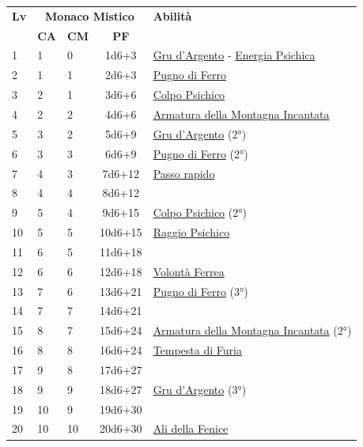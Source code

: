 {\begin{multicols}{2}


\noindent\begin{tabularx}{\linewidth}{p{0.3cm}|p{0.3cm}p{0.3cm}c|X|}
	\toprule
 \rowcolor{gray!20}	\textbf{Lv} & \multicolumn{3}{c|}{\textbf{Monaco Mistico}} & \textbf{Abilità} \\
& \centering\arraybackslash \textbf{CA} & \centering\arraybackslash \textbf{CM} & \centering\arraybackslash \textbf{PF} & \\
	\toprule
	1 &1	& 0	&	1d6+3	&\hyperlink{Gru d'Argento}{Gru d'Argento} - \hyperlink{Energia Psichica}{Energia Psichica}\\
 \rowcolor{gray!20}2	&	1	& 1	&	2d6+3	&\hyperlink{Pugno di Ferro}{Pugno di Ferro}\\
	3	&	2	& 1	&	3d6+6	&\hyperlink{Colpo Psichico}{Colpo Psichico}\\
 \rowcolor{gray!20}4	&	2	& 2	&	4d6+6	&\hyperlink{Armatura della Montagna Incantata}{Armatura della Montagna Incantata}\\
	5	&	3	& 2	&	5d6+9	&\hyperlink{Gru d'Argento}{Gru d'Argento} (2°)\\
 \rowcolor{gray!20}6	&	3	& 3	&	6d6+9	&\hyperlink{Pugno di Ferro}{Pugno di Ferro} (2°)\\
	7	&	4	& 3	&	7d6+12	&\hyperlink{Passo rapido}{Passo rapido}\\
 \rowcolor{gray!20}8	&	4	& 4	&	8d6+12	&\\
	9	&	5	& 4	&	9d6+15	&\hyperlink{Colpo Psichico}{Colpo Psichico} (2°)\\
 \rowcolor{gray!20}10	&	5	& 5	&	10d6+15	&\hyperlink{Raggio Psichico}{Raggio Psichico}\\
	11	&	6	& 5	&	11d6+18	&\\
 \rowcolor{gray!20}12	&	6	& 6	&	12d6+18	&\hyperlink{Volontà Ferrea}{Volontà Ferrea}\\
	13	&	7	& 6	&	13d6+21	&\hyperlink{Pugno di Ferro}{Pugno di Ferro} (3°)\\
 \rowcolor{gray!20}14	&	7	& 7	&	14d6+21	&\\
	15	&	8	& 7	&	15d6+24	&\hyperlink{Armatura della Montagna Incantata}{Armatura della Montagna Incantata} (2°)\\
 \rowcolor{gray!20}16	&	8	& 8	&	16d6+24	&\hyperlink{Tempesta di Furia}{Tempesta di Furia}\\
	17	&	9	& 8	&	17d6+27	&\\
 \rowcolor{gray!20}18	&	9	& 9	&	18d6+27	&\hyperlink{Gru d'Argento}{Gru d'Argento} (3°)\\
	19	&	10	& 9	&	19d6+30	&\\
 \rowcolor{gray!20}20	&	10	& 10	&	20d6+30	&\hyperlink{Ali della Fenice}{Ali della Fenice}\\
\end{tabularx}


\end{multicols}}
